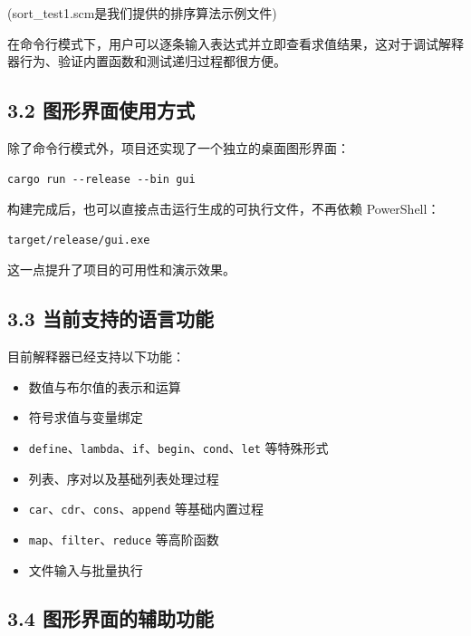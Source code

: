 \documentclass[12pt, a4paper]{ctexart}
\begin{document}
(sort\_test1.scm是我们提供的排序算法示例文件)

在命令行模式下，用户可以逐条输入表达式并立即查看求值结果，这对于调试解释器行为、验证内置函数和测试递归过程都很方便。

\subsection*{3.2 图形界面使用方式}

除了命令行模式外，项目还实现了一个独立的桌面图形界面：

\begin{verbatim}
cargo run --release --bin gui
\end{verbatim}

构建完成后，也可以直接点击运行生成的可执行文件，不再依赖 PowerShell：

\begin{verbatim}
target/release/gui.exe
\end{verbatim}

这一点提升了项目的可用性和演示效果。

\subsection*{3.3 当前支持的语言功能}

目前解释器已经支持以下功能：

\begin{itemize}
\item 数值与布尔值的表示和运算
\item 符号求值与变量绑定
\item \verb|define|、\verb|lambda|、\verb|if|、\verb|begin|、\verb|cond|、\verb|let| 等特殊形式
\item 列表、序对以及基础列表处理过程
\item \verb|car|、\verb|cdr|、\verb|cons|、\verb|append| 等基础内置过程
\item \verb|map|、\verb|filter|、\verb|reduce| 等高阶函数
\item 文件输入与批量执行
\end{itemize}

\subsection*{3.4 图形界面的辅助功能}
\end{document}
